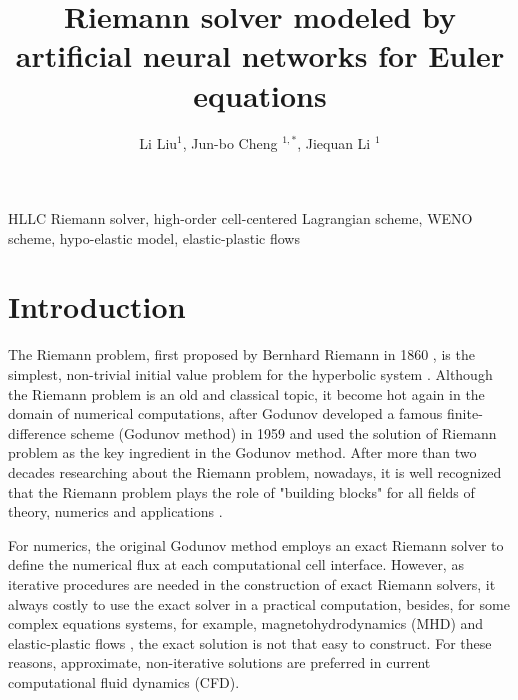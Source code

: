 \documentclass[review]{elsarticle}
\begin{document}
\title{Riemann solver modeled by artificial neural networks for Euler equations}

\author{Li Liu$^1$, Jun-bo Cheng $^{1,*}$, Jiequan Li $^{1}$}


\maketitle

\address{$^1$  Institute of Applied Physics and Computational Mathematics, Beijing 100094, China }

\begin{abstract}


\end{abstract}

\begin{keyword}
  HLLC Riemann solver, high-order cell-centered Lagrangian scheme,  WENO scheme,  hypo-elastic model, elastic-plastic flows
\end{keyword}


\section{Introduction}
The Riemann problem, first proposed by Bernhard Riemann  in 1860 \cite{riemann1960fortpflanzung}, is the simplest, non-trivial initial value problem for the hyperbolic system \cite{toro2013riemann}. Although  the Riemann problem is an old and classical topic,  it become hot again in the domain of numerical computations, after Godunov developed a famous finite-difference scheme (Godunov method) in 1959 \cite{godunov1959finite} and used the solution of Riemann problem as the key ingredient in the Godunov method.  
After more than two decades researching about the Riemann problem, nowadays, it is well recognized that the Riemann problem plays the role of "building blocks" for all fields of theory, numerics and applications \cite{jiequan2009two, gel1959some}. 

For numerics, the original Godunov method employs an exact Riemann solver to define the numerical flux at each computational cell interface.  However, as iterative procedures are  needed in the construction of exact Riemann solvers, it always costly to use the exact solver in a practical computation, besides, for some complex equations systems, for example, magnetohydrodynamics (MHD)\cite{giacomazzo2006exact} and elastic-plastic flows \cite{gao2018complete}, the exact solution is not that easy to construct. For these reasons, approximate, non-iterative solutions are preferred in current computational fluid dynamics (CFD). 
\end{document}
